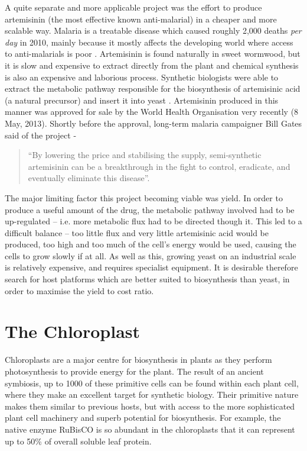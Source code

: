 A quite separate and more applicable project was the effort to produce 
artemisinin (the most effective known anti-malarial) in a cheaper and more 
scalable way.
Malaria is a treatable disease which caused roughly 2,000 deaths 
\emph{per day} in 2010, mainly because it mostly affects the developing world 
where access to anti-malarials is poor \citep{malaria}.
Artemisinin is found naturally in sweet wormwood, but it is slow and expensive
to extract directly from the plant and chemical synthesis is also an expensive
and laborious process.
Synthetic biologists were able to extract the metabolic pathway responsible for
the biosynthesis of artemisinic acid (a natural precursor) and insert it into 
yeast \citep{yeast}.
Artemisinin produced in this manner was approved for sale by the World Health
Organisation very recently (8 May, 2013).
Shortly before the approval, long-term malaria campaigner Bill Gates said of 
the project -
\begin{quote}
  ``By lowering the price and stabilising the supply, semi-synthetic artemisinin
  can be a breakthrough in the fight to control, eradicate, and eventually
  eliminate this disease''.
\end{quote}

The major limiting factor this project becoming viable was yield.
In order to produce a useful amount of the drug, the metabolic pathway 
involved had to be up-regulated -- i.e. more metabolic flux had to be directed 
though it.
This led to a difficult balance -- too little flux and very little
artemisinic acid would be produced, too high and too much of the cell's
energy would be used, causing the cells to grow slowly if at all.
As well as this, growing yeast on an industrial scale is relatively expensive,
and requires specialist equipment.
It is desirable therefore search for host platforms which are better suited to
biosynthesis than yeast, in order to maximise the yield to cost ratio.

\section{The Chloroplast}
\label{sec:intro_chloroplast}

Chloroplasts are a major centre for biosynthesis in plants as they perform
photosynthesis to provide energy for the plant.
The result of an ancient symbiosis, up to 1000 of these primitive cells can be 
found within each plant cell, where they make an excellent target for synthetic
biology.
Their primitive nature makes them similar to previous hosts, 
but with access to the more sophisticated plant cell machinery and 
superb potential for biosynthesis.
For example, the native enzyme RuBisCO is so abundant in the chloroplasts that 
it can represent up to 50\% of overall soluble leaf protein.

